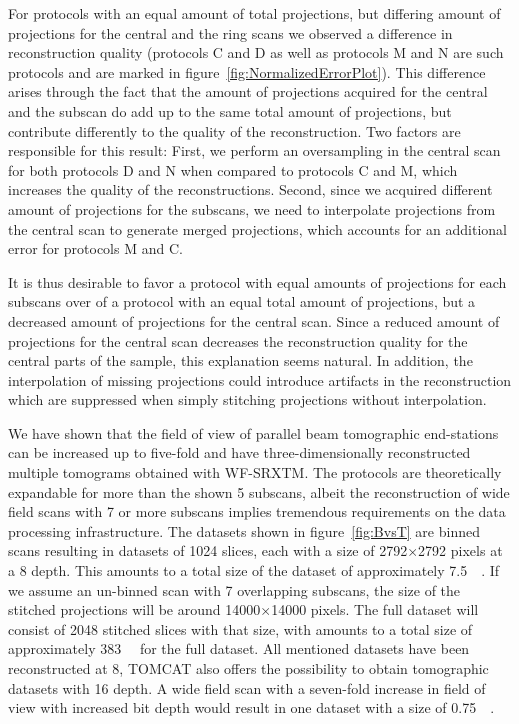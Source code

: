 For protocols with an equal amount of total projections, but differing amount of projections for the central and the ring scans we observed a difference in reconstruction quality (protocols C and D as well as protocols M and N are such protocols and are marked in figure~\ref{fig:NormalizedErrorPlot}). This difference arises through the fact that the amount of projections acquired for the central and the subscan do add up to the same total amount of projections, but contribute differently to the quality of the reconstruction. Two factors are responsible for this result: First, we perform an oversampling in the central scan for both protocols D and N when compared to protocols C and M, which increases the quality of the reconstructions. Second, since we acquired different amount of projections for the subscans, we need to interpolate projections from the central scan to generate merged projections, which accounts for an additional error for protocols M and C.

It is thus desirable to favor a protocol with equal amounts of projections for each subscans over of a protocol with an equal total amount of projections, but a decreased amount of projections for the central scan. Since a reduced amount of projections for the central scan decreases the reconstruction quality for the central parts of the sample, this explanation seems natural. In addition, the interpolation of missing projections could introduce artifacts in the reconstruction which are suppressed when simply stitching projections without interpolation.

We have shown that the field of view of parallel beam tomographic end-stations can be increased up to five-fold and have three-dimensionally reconstructed multiple tomograms obtained with WF-SRXTM. The protocols are theoretically expandable for more than the shown 5 subscans, albeit the reconstruction of wide field scans with 7 or more subscans implies tremendous requirements on the data processing infrastructure. The datasets shown in figure~\ref{fig:BvsT} are binned scans resulting in datasets of 1024 slices, each with a size of 2792$\times$2792 pixels at a \SI{8}{\bit} depth. This amounts to a total size of the dataset of approximately \SI{7.5}{\giga\byte}. If we assume an un-binned scan with 7 overlapping subscans, the size of the stitched projections will be around 14000$\times$14000 pixels. The full dataset will consist of 2048 stitched slices with that size, with amounts to a total size of approximately \SI{383}{\giga\byte} for the full dataset. All mentioned datasets have been reconstructed at \SI{8}{\bit}, TOMCAT also offers the possibility to obtain tomographic datasets with \SI{16}{\bit} depth. A wide field scan with a seven-fold increase in field of view with increased bit depth would result in one dataset with a size of \SI{0.75}{\tera\byte}.

